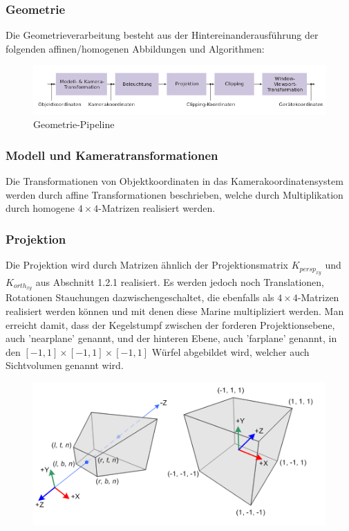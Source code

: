 \subsubsection{Geometrie}
Die Geometrieverarbeitung   besteht aus der Hintereinanderausführung der folgenden affinen/homogenen Abbildungen und Algorithmen:
\begin{figure}[H]
    \centering
    \includegraphics[width=1.0\textwidth]{images/cgpipeline.png}
    \caption{Geometrie-Pipeline}
    \label{fig:gimbal+lock}
\end{figure}

\subsubsection*{Modell und Kameratransformationen}
Die Transformationen von Objektkoordinaten in das Kamerakoordinatensystem werden durch affine Transformationen beschrieben, welche durch Multiplikation durch homogene $4 \times 4$-Matrizen realisiert werden. 

\subsubsection*{Projektion}
Die Projektion  wird durch  Matrizen  ähnlich der Projektionsmatrix $K_{persp_{xy}}$ und   $K_{orth_{xy}}$ aus Abschnitt 1.2.1 realisiert.
Es werden jedoch noch  Translationen, Rotationen Stauchungen dazwischengeschaltet, die ebenfalls als $4 \times 4$-Matrizen realisiert werden können und mit denen diese Marine multipliziert werden.  Man erreicht damit, dass der Kegelstumpf zwischen der forderen Projektionsebene, auch 'nearplane' genannt,  und der hinteren Ebene, auch 'farplane' genannt, in den $[-1,1] \times [-1,1] \times [-1,1] $ Würfel abgebildet wird, welcher auch Sichtvolumen genannt wird.   
\begin{figure}[H]
    \centering
    \includegraphics[width=1.0\textwidth]{images/gl_projectionmatrix01.png}
\end{figure}

